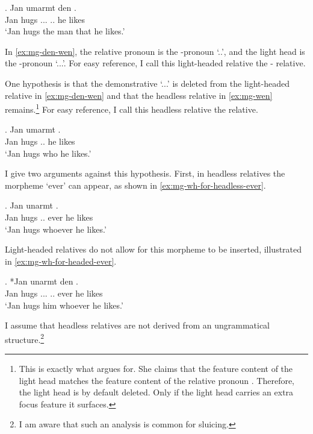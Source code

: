 \exg. Jan umarmt den   .\\
Jan hugs ... .. he likes\\
`Jan hugs the man that he likes.'\label{ex:mg-den-wen}

In \ref{ex:mg-den-wen}, the relative pronoun is the -pronoun  `..', and the light head is the -pronoun  `...'. For easy reference, I call this light-headed relative the - relative.

One hypothesis is that the demonstrative  `...' is deleted from the light-headed relative in \ref{ex:mg-den-wen} and that the headless relative in \ref{ex:mg-wen} remains.\footnote{
This is exactly what \citet{hanink2018} argues for. She claims that the feature content of the light head  matches the feature content of the relative pronoun . Therefore, the light head is by default deleted. Only if the light head carries an extra focus feature it surfaces.
}
For easy reference, I call this headless relative the  relative.

\exg. Jan umarmt   .\\
Jan hugs .. he likes\\
`Jan hugs who he likes.'\label{ex:mg-wen}

I give two arguments against this hypothesis. First, in headless relatives the morpheme  `ever' can appear, as shown in \ref{ex:mg-wh-for-headless-ever}.

\exg. Jan unarmt  { }  .\\
Jan hugs .. ever he likes\\
`Jan hugs whoever he likes.'\label{ex:mg-wh-for-headless-ever}

Light-headed relatives do not allow for this morpheme to be inserted, illustrated in \ref{ex:mg-wh-for-headed-ever}.

\exg. *Jan unarmt den  { }  .\\
Jan hugs ... .. ever he likes\\
`Jan hugs him whoever he likes.'\label{ex:mg-wh-for-headed-ever}%

I assume that headless relatives are not derived from an ungrammatical structure.\footnote{
I am aware that such an analysis is common for sluicing.
}

